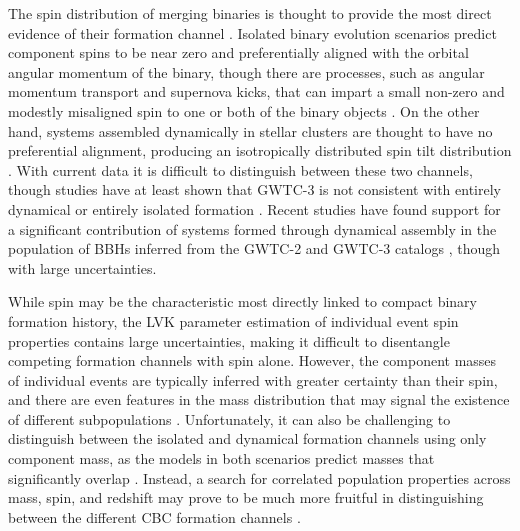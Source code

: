 The spin distribution of merging binaries is thought to provide the most direct evidence of their formation channel \citep{2017Natur.548..426F,2018ApJ...854L...9F}. Isolated binary evolution scenarios predict component spins to be near zero and preferentially aligned with the orbital angular momentum of the binary, though there are processes, such as angular momentum transport and supernova kicks, that can impart a small non-zero and modestly misaligned spin to one or both of the binary objects \citep{2203.02515, 1706.07053, 10.1051/0004-6361/201936204, 10.1051/0004-6361/202039804}. On the other hand, systems assembled dynamically in stellar clusters are thought to have no preferential alignment, producing an isotropically distributed spin tilt distribution \citep{10.3847/2041-8205/832/1/L2,10.1103/PhysRevD.100.043027}. With current data it is difficult to distinguish between these two channels, though studies have at least shown that GWTC-3 is not consistent with entirely dynamical or entirely isolated formation \citep{2021arXiv211103634T,2022ApJ...937L..13C,2022arXiv220902206T,2022arXiv221012834E,10.3847/2041-8213/ac86c4,10.48550/arXiv.2011.09570}. Recent studies have found support for a significant contribution of systems formed through dynamical assembly in the population of BBHs inferred from the GWTC-2 and GWTC-3 catalogs \citep{2021ApJ...913L...7A,2021PhRvD.104h3010R,2021arXiv211103634T,2022ApJ...937L..13C,2021ApJ...921L..15G,2022arXiv220902206T,2022arXiv220906978V,2022arXiv221012834E}, though with large uncertainties. 

While spin may be the characteristic most directly linked to compact binary formation history, the LVK parameter estimation of individual event spin properties contains large uncertainties, making it difficult to disentangle competing formation channels with spin alone. However, the component masses of individual events are typically inferred with greater certainty than their spin, and there are even features in the mass distribution that may signal the existence of different subpopulations \citep{2021ApJ...913L..19T,2022ApJ...924..101E,2021arXiv211103634T,2022ApJ...928..155T,2022arXiv221012834E}. Unfortunately, it can also be challenging to distinguish between the isolated and dynamical formation channels using only component mass, as the models in both scenarios predict masses that significantly overlap \citep{1609.05916}. Instead, a search for correlated population properties across mass, spin, and redshift may prove to be much more fruitful in distinguishing between the different CBC formation channels \citep{2021ApJ...912...98F,2021ApJ...922L...5C,2022ApJ...931...17V,2022ApJ...932L..19B}. 

